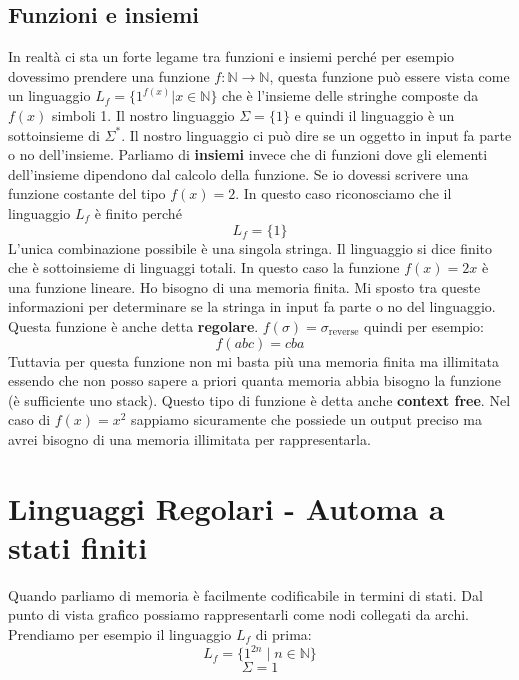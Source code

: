 \documentclass[a4paper]{article}
\begin{document}
\subsection{Funzioni e insiemi}

In realtà ci sta un forte legame tra funzioni e insiemi perché per esempio dovessimo prendere una funzione
$f : \mathbb{N} \rightarrow \mathbb{N}$, questa funzione può essere vista come un linguaggio $L_f = \{1^{f(x)} | x \in \mathbb{N}\}$ 
che è l'insieme delle stringhe composte da $f(x)$ simboli 1.
Il nostro linguaggio $\Sigma = \{1\}$ e quindi il linguaggio è un sottoinsieme di $\Sigma^*$.
Il nostro linguaggio ci può dire se un oggetto in input fa parte o no dell'insieme.
Parliamo di \textbf{insiemi} invece che di funzioni
dove gli elementi dell'insieme dipendono dal calcolo della funzione.
\ex{}
{
    Se io dovessi scrivere una funzione costante del tipo $f(x) = 2$.
    In questo caso riconosciamo che il linguaggio $L_f$ è finito perché
    \[L_f = \{1\}\]
    L'unica combinazione possibile è una singola stringa.
    Il linguaggio si dice finito che è sottoinsieme di linguaggi totali.
}
\ex{}
{
    In questo caso la funzione $f(x) = 2x$ è una funzione lineare.
    Ho bisogno di una memoria finita. Mi sposto tra queste informazioni per
    determinare se la stringa in input fa parte o no del linguaggio.
    Questa funzione è anche detta \textbf{regolare}.
}
\ex{}
{
    $f(\sigma) = \sigma_{\text{reverse}}$ quindi per esempio:
    \[f(abc) = cba\]
    Tuttavia per questa funzione non mi basta più una memoria finita ma
    illimitata essendo che non posso sapere a priori quanta memoria abbia bisogno la funzione
    (è sufficiente uno stack).
    Questo tipo di funzione è detta anche \textbf{context free}.
}
\ex{}
{
    Nel caso di $f(x) = x^2$ sappiamo sicuramente
    che possiede un output preciso ma avrei bisogno di una memoria illimitata per rappresentarla.
}

\section{Linguaggi Regolari - Automa a stati finiti}

Quando parliamo di memoria è facilmente codificabile 
in termini di stati. Dal punto di vista grafico possiamo rappresentarli
come nodi collegati da archi.
Prendiamo per esempio il linguaggio $L_f$ di prima:
\[L_f = \{1^{2n} \; | \; n \in \mathbb{N}\}\]
\[\Sigma = {1}\]

\begin{figure}[H]
    \centering
  \end{figure}
\end{document}
